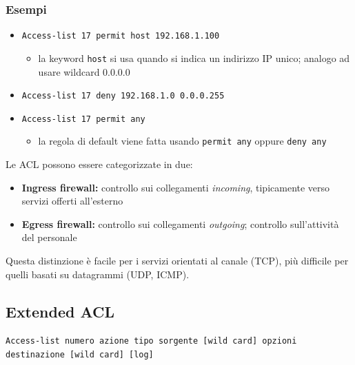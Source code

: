 \subsubsection{Esempi}
\begin{itemize}
    \item \texttt{Access-list 17 permit host 192.168.1.100}
    \begin{itemize}
        \item la keyword \texttt{host} si usa quando si indica un indirizzo IP unico; analogo 
        ad usare wildcard 0.0.0.0
    \end{itemize}
    \item \texttt{Access-list 17 deny 192.168.1.0 0.0.0.255}
    \item \texttt{Access-list 17 permit any}
    \begin{itemize}
        \item la regola di default viene fatta usando \texttt{permit any} oppure \texttt{deny any}
    \end{itemize}
\end{itemize}

\noindent Le ACL possono essere categorizzate in due:
\begin{itemize}
    \item \textbf{Ingress firewall:} controllo sui collegamenti \textit{incoming}, tipicamente verso 
    servizi offerti all'esterno
    \item \textbf{Egress firewall:} controllo sui collegamenti \textit{outgoing}; controllo sull'attività del personale
\end{itemize}

\noindent Questa distinzione è facile per i servizi orientati al canale (TCP), più difficile 
per quelli basati su datagrammi (UDP, ICMP).

\subsection{Extended ACL}
\begin{center}
    \texttt{Access-list numero azione tipo sorgente [wild card] opzioni
    destinazione [wild card] [log]}
\end{center}

